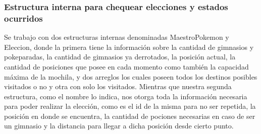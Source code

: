 \subsubsection{Estructura interna para chequear elecciones y estados ocurridos}

Se trabajo con dos estructuras internas denominadas MaestroPokemon y Eleccion, donde la primera tiene la informaci\'on sobre la cantidad de gimnasios y pokeparadas, la cantidad de gimnasios ya derrotados, la posici\'on actual, la cantidad de posiciones que posee en cada momento como tambi\'en la capacidad m\'axima de la mochila, y dos arreglos los cuales poseen todos los destinos posibles visitados o no y otra con solo los visitados.
Mientras que nuestra segunda estructura, como el nombre lo indica, nos otorga toda la informaci\'on necesaria para poder realizar la elecci\'on, como es el id de la misma para no ser repetida, la posici\'on en donde se encuentra, la cantidad de pociones necesarias en caso de ser un gimnasio y la distancia para llegar a dicha posici\'on desde cierto punto.

